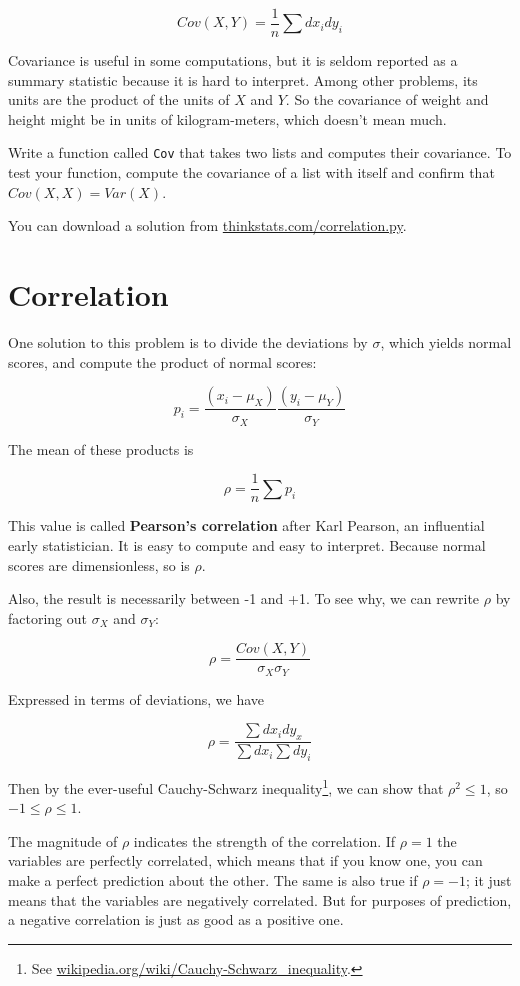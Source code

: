 \documentclass[12pt]{book}
\begin{document}
\[ Cov(X,Y) = \frac{1}{n} \sum dx_i dy_i \]

Covariance is useful in some computations, but
it is seldom reported as a summary statistic because it is hard to
interpret.  Among other problems, its units are the product of the
units of $X$ and $Y$.  So the covariance of weight and height might be
in units of kilogram-meters, which doesn't mean much.

\begin{ex}

Write a function called {\tt Cov} that takes two lists
and computes their covariance.  To test your function, compute
the covariance of a list with itself and confirm that
$Cov(X, X) = Var(X)$.

You can download a solution from
\url{thinkstats.com/correlation.py}.

\end{ex}


\section{Correlation}

One solution to this problem is to divide the deviations by $\sigma$,
which yields normal scores, and compute the product of normal scores:

\[ p_i = \frac{(x_i - \mu_X)}{\sigma_X} \frac{(y_i - \mu_Y)}{\sigma_Y} \]

The mean of these products is

\[ \rho = \frac{1}{n} \sum p_i \]

This value is called {\bf Pearson's correlation} after Karl Pearson,
an influential early statistician.  It is easy to compute and easy to
interpret.  Because normal scores are dimensionless, so is $\rho$.

Also, the result is necessarily between -1 and +1.  To see why, we
can rewrite $\rho$ by factoring out $\sigma_X$ and $\sigma_Y$:

\[ \rho = \frac{Cov(X,Y)}{\sigma_X \sigma_Y} \]

Expressed in terms of deviations, we have

\[ \rho = \frac{\sum dx_i dy_x}{\sum dx_i \sum dy_i} \]

Then by the ever-useful Cauchy-Schwarz inequality\footnote{See
  \url{wikipedia.org/wiki/Cauchy-Schwarz_inequality}.}, we can show
that $\rho^2 \le 1$, so $-1 \le \rho \le 1$.

The magnitude of $\rho$ indicates the strength of the correlation.  If
$\rho=1$ the variables are perfectly correlated, which means that if
you know one, you can make a perfect prediction about the other.  The
same is also true if $\rho=-1$; it just means that the variables
are negatively correlated.  But for purposes of prediction, a
negative correlation is just as good as a positive one.
\end{document}

